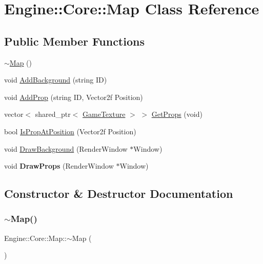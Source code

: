 \hypertarget{class_engine_1_1_core_1_1_map}{}\section{Engine\+:\+:Core\+:\+:Map Class Reference}
\label{class_engine_1_1_core_1_1_map}
\subsection*{Public Member Functions}
\begin{DoxyCompactItemize}
\item 
\hyperlink{class_engine_1_1_core_1_1_map_a211f38a71b97179bbbd153442225a273}{$\sim$\+Map} ()
\item 
void \hyperlink{class_engine_1_1_core_1_1_map_aa81a28822b49c3c7750f0444a189ed8c}{Add\+Background} (string ID)
\item 
void \hyperlink{class_engine_1_1_core_1_1_map_aad4517115b5d8713aed2f67338cd7259}{Add\+Prop} (string ID, Vector2f Position)
\item 
vector$<$ shared\+\_\+ptr$<$ \hyperlink{class_engine_1_1_core_1_1_game_texture}{Game\+Texture} $>$ $>$ \hyperlink{class_engine_1_1_core_1_1_map_afafd62cdfe87b27796d0900e76aa09ea}{Get\+Props} (void)
\item 
bool \hyperlink{class_engine_1_1_core_1_1_map_a5d17ba161757b4b971dba919e7e0b1c1}{Is\+Prop\+At\+Position} (Vector2f Position)
\item 
void \hyperlink{class_engine_1_1_core_1_1_map_aea4443f092aabf355e2427fa27605d4d}{Draw\+Background} (Render\+Window $\ast$Window)
\item 
\mbox{\label{class_engine_1_1_core_1_1_map_a1d24a07606dca61d86decc02eb9691d8}} 
void {\bfseries Draw\+Props} (Render\+Window $\ast$Window)
\end{DoxyCompactItemize}


\subsection{Constructor \& Destructor Documentation}
\mbox{\label{class_engine_1_1_core_1_1_map_a211f38a71b97179bbbd153442225a273}} 
\subsubsection{\texorpdfstring{$\sim$\+Map()}{~Map()}}
{\footnotesize\ttfamily Engine\+::\+Core\+::\+Map\+::$\sim$\+Map (\begin{DoxyParamCaption}{ }\end{DoxyParamCaption})}

